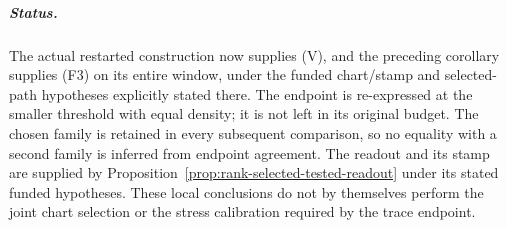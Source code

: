 \subparagraph{Status.}
The actual restarted construction now supplies (V), and the preceding
corollary supplies (F3) on its entire window, under the funded
chart/stamp and selected-path hypotheses explicitly stated there.
The endpoint is re-expressed at the smaller threshold with equal
density; it is not left in its original budget. The chosen family is
retained in every subsequent comparison, so no equality with a second
family is inferred from endpoint agreement. The readout and its stamp
are supplied by Proposition~\ref{prop:rank-selected-tested-readout}
under its stated funded hypotheses. These local conclusions do not by
themselves perform the joint chart selection or the stress calibration
required by the trace endpoint.
